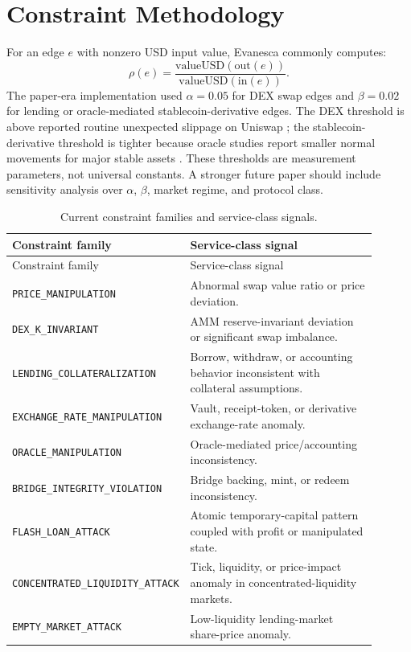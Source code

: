\documentclass[10pt]{article}
\newcommand{\sys}{Evanesca\xspace}
\newcommand{\constraint}[1]{{\footnotesize\texttt{#1}}}
\begin{document}
\section{Constraint Methodology}
\label{sec:constraints}

For an edge \(e\) with nonzero USD input value, \sys commonly computes:
\[
  \rho(e) =
  \frac{\mathrm{valueUSD}(\mathrm{out}(e))}
       {\mathrm{valueUSD}(\mathrm{in}(e))}.
\]
The paper-era implementation used \(\alpha=0.05\) for DEX swap edges and
\(\beta=0.02\) for lending or oracle-mediated stablecoin-derivative edges. The
DEX threshold is above reported routine unexpected slippage on Uniswap
\cite{zhou2021high}; the stablecoin-derivative threshold is tighter because
oracle studies report smaller normal movements for major stable assets
\cite{liu2021firstlook}. These thresholds are measurement parameters, not
universal constants. A stronger future paper should include sensitivity
analysis over \(\alpha\), \(\beta\), market regime, and protocol class.

\begin{longtable}{p{0.31\linewidth}p{0.59\linewidth}}
\caption{Current constraint families and service-class signals.}
\label{tab:constraint_families}\\
\toprule
Constraint family & Service-class signal \\
\midrule
\endfirsthead
\toprule
Constraint family & Service-class signal \\
\midrule
\endhead
\constraint{PRICE\_MANIPULATION} & Abnormal swap value ratio or price deviation. \\
\constraint{DEX\_K\_INVARIANT} & AMM reserve-invariant deviation or significant swap imbalance. \\
\constraint{LENDING\_COLLATERALIZATION} & Borrow, withdraw, or accounting behavior inconsistent with collateral assumptions. \\
\constraint{EXCHANGE\_RATE\_MANIPULATION} & Vault, receipt-token, or derivative exchange-rate anomaly. \\
\constraint{ORACLE\_MANIPULATION} & Oracle-mediated price/accounting inconsistency. \\
\constraint{BRIDGE\_INTEGRITY\_VIOLATION} & Bridge backing, mint, or redeem inconsistency. \\
\constraint{FLASH\_LOAN\_ATTACK} & Atomic temporary-capital pattern coupled with profit or manipulated state. \\
\constraint{CONCENTRATED\_LIQUIDITY\_ATTACK} & Tick, liquidity, or price-impact anomaly in concentrated-liquidity markets. \\
\constraint{EMPTY\_MARKET\_ATTACK} & Low-liquidity lending-market share-price anomaly. \\
\bottomrule
\end{longtable}
\end{document}
